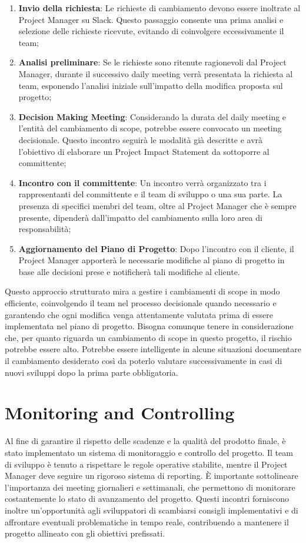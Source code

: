\documentclass[a4paper,12pt, openright]{report}
\begin{document}
\begin{enumerate}
    \item \textbf{Invio della richiesta}: Le richieste di cambiamento devono essere inoltrate al Project Manager su Slack. Questo passaggio consente una prima analisi e selezione delle richieste ricevute, evitando di coinvolgere eccessivamente il team;
    \item \textbf{Analisi preliminare}: Se le richieste sono ritenute ragionevoli dal Project Manager, durante il successivo daily meeting verrà presentata la richiesta al team, esponendo l'analisi iniziale sull'impatto della modifica proposta sul progetto;
    \item \textbf{Decision Making Meeting}: Considerando la durata del daily meeting e l'entità del cambiamento di scope, potrebbe essere convocato un meeting decisionale. Questo incontro seguirà le modalità già descritte e avrà l'obiettivo di elaborare un Project Impact Statement da sottoporre al committente;
    \item \textbf{Incontro con il committente}: Un incontro verrà organizzato tra i rappresentanti del committente e il team di sviluppo o una sua parte. La presenza di specifici membri del team, oltre al Project Manager che è sempre presente, dipenderà dall'impatto del cambiamento sulla loro area di responsabilità;
    \item \textbf{Aggiornamento del Piano di Progetto}: Dopo l'incontro con il cliente, il Project Manager apporterà le necessarie modifiche al piano di progetto in base alle decisioni prese e notificherà tali modifiche al cliente.
\end{enumerate}
Questo approccio strutturato mira a gestire i cambiamenti di scope in modo efficiente, coinvolgendo il team nel processo decisionale quando necessario e garantendo che ogni modifica venga attentamente valutata prima di essere implementata nel piano di progetto.
Bisogna comunque tenere in considerazione che, per quanto riguarda un cambiamento di scope in questo progetto, il rischio potrebbe essere alto. Potrebbe essere intelligente in alcune situazioni documentare il cambiamento desiderato così da poterlo valutare successivamente in casi di nuovi sviluppi dopo la prima parte obbligatoria.

\chapter{Monitoring and Controlling}
Al fine di garantire il rispetto delle scadenze e la qualità del prodotto finale, è stato implementato un sistema di monitoraggio e controllo del progetto. Il team di sviluppo è tenuto a rispettare le regole operative stabilite, mentre il Project Manager deve seguire un rigoroso sistema di reporting.
È importante sottolineare l'importanza dei meeting giornalieri e settimanali, che permettono di monitorare costantemente lo stato di avanzamento del progetto. Questi incontri forniscono inoltre un'opportunità agli sviluppatori di scambiarsi consigli implementativi e di affrontare eventuali problematiche in tempo reale, contribuendo a mantenere il progetto allineato con gli obiettivi prefissati.
\end{document}
